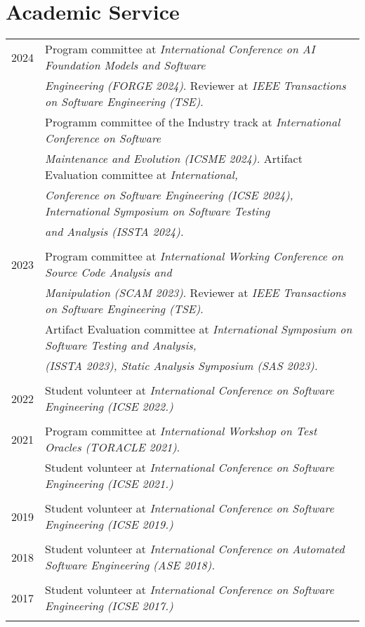 \documentclass[a4paper,10pt]{article} %
\begin{document}
\section{Academic Service}
\begin{longtable}{rl}

\textsc{2024} & Program committee at \textit{International Conference on AI Foundation Models and Software} \\ 
& \textit{Engineering (FORGE 2024)}. Reviewer at \textit{IEEE Transactions on Software Engineering (TSE)}. \\
& Programm committee of the Industry track at \textit{International Conference on Software} \\
& \textit{Maintenance and Evolution (ICSME 2024).} Artifact Evaluation committee at \textit{International,} \\
& \textit{Conference on Software Engineering (ICSE 2024), International Symposium on Software Testing} \\ 
& \textit{and Analysis (ISSTA 2024).} \\ & \\

\textsc{2023} & Program committee at \textit{International Working Conference on Source Code Analysis and} \\ 
& \textit{Manipulation (SCAM 2023)}. Reviewer at \textit{IEEE Transactions on Software Engineering (TSE)}. \\
& Artifact Evaluation committee at \textit{International Symposium on Software Testing and Analysis,} \\ 
& \textit{(ISSTA 2023), Static Analysis Symposium (SAS 2023).} \\ & \\

\textsc{2022} & Student volunteer at \textit{International Conference on Software Engineering (ICSE 2022.)} \\ & \\ 

\textsc{2021} & Program committee at \textit{International Workshop on Test Oracles (TORACLE 2021)}. \\
& Student volunteer at \textit{International Conference on Software Engineering (ICSE 2021.)} \\ & \\

\textsc{2019} & Student volunteer at \textit{International Conference on Software Engineering (ICSE 2019.)} \\ & \\ 

\textsc{2018} & Student volunteer at \textit{International Conference on Automated Software Engineering (ASE 2018).} \\ & \\ 

\textsc{2017} & Student volunteer at \textit{International Conference on Software Engineering (ICSE 2017.)} \\ & \\ 

\end{longtable}
\end{document}
